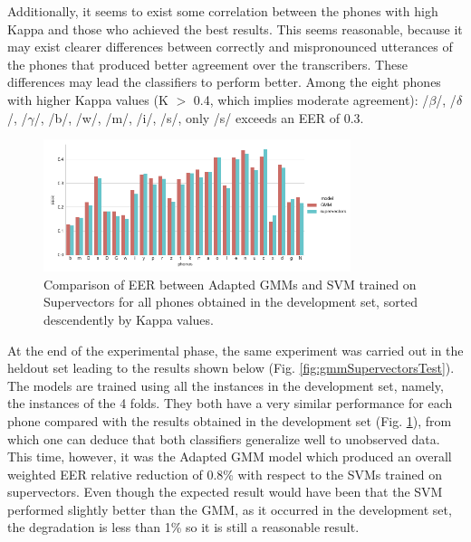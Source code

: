 Additionally, it seems to exist some correlation between the phones with high Kappa
and those who achieved
the best results. This seems reasonable, because it may exist clearer differences
between correctly and mispronounced
utterances of the phones that produced better agreement over the transcribers.
These differences may lead the classifiers to perform better.
Among the eight phones with higher Kappa values (K $>$ 0.4, which implies moderate agreement):
/$\beta$/, /$\delta$/, /$\gamma$/, /b/, /w/, /m/, /i/, /s/, only /s/ exceeds an EER of 0.3.

\begin{figure}[H]
	\centering
	\includegraphics[width=0.8\textwidth]{files/figures/results/gmm-vs-supervectors/gmm-vs-supervectors-dev.png}
	\caption{Comparison of EER between Adapted GMMs
	and SVM trained on Supervectors for all phones obtained in the development set, sorted
	descendently by Kappa values.}
	\label{fig:gmmSupervectorsDev}
\end{figure}

At the end of the experimental phase,
the same experiment was carried out in the heldout set
leading to the results shown below
(Fig. \ref{fig:gmmSupervectorsTest}).
The models are trained using all the instances in the development set, namely, the
instances of the 4 folds.
They both have a very similar performance for each phone compared with the results obtained
in the development set (Fig. \ref{fig:gmmSupervectorsDev}),
from which one can deduce that both classifiers generalize well to
unobserved data. This time, however, it was the Adapted GMM model
which produced an overall weighted EER relative reduction of 0.8\% with respect to the SVMs
trained on supervectors. Even though the expected result would have been that the SVM performed
slightly better than the GMM, as it occurred in the development set,
the degradation is less than 1\% so it is still a reasonable result.

